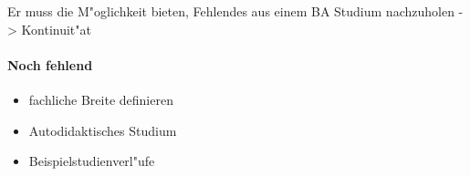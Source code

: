 \begin{kcmt}\begin{komacmt}
Er muss die M"oglichkeit bieten, Fehlendes aus einem BA Studium nachzuholen -> Kontinuit"at
\end{komacmt}\end{kcmt}

\begin{kcmt}\begin{komacmt}
\paragraph{Noch fehlend}
\begin{itemize}
 \item fachliche Breite definieren
 \item Autodidaktisches Studium
 \item Beispielstudienverl"ufe
\end{itemize}
\end{komacmt}\end{kcmt}
